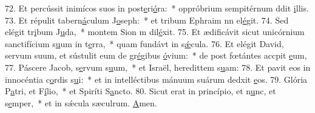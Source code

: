 72. Et percússit inimícos suos in post\uline{e}ri\uline{ó}ra:~* oppróbrium sempitérnum ddit \uline{i}llis.
73. Et répulit tabern\uline{á}culum J\uline{o}seph:~* et tribum Ephraim nn el\uline{é}git.
74. Sed elégit tr\uline{i}bum J\uline{u}da,~* montem Sion m dil\uline{é}xit.
75. Et ædificávit sicut unicórnium sanctifícium s\uline{u}um in t\uline{e}rra,~* quam fundávt in s\uline{ǽ}cula.
76. Et elégit David, servum suum, et sústulit eum de gr\uline{é}gibus \uline{ó}vium:~* de post fœtántes accpit \uline{e}um,
77. Páscere Jacob, s\uline{e}rvum s\uline{u}um,~* et Israël, heredittem s\uline{u}am:
78. Et pavit eos in innocéntia c\uline{o}rdis s\uline{u}i:~* et in intelléctibus mánuum suárum dedxit \uline{e}os.
79. Glória P\uline{a}tri, et F\uline{í}lio,~* et Spiríti S\uline{a}ncto.
80. Sicut erat in princípio, et n\uline{u}nc, et s\uline{e}mper,~* et in sǽcula sæculrum. \uline{A}men.
